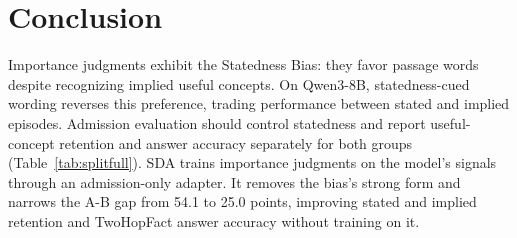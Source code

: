 \section{Conclusion}\label{sec:conclusion}

Importance judgments exhibit the Statedness Bias: they favor passage words despite recognizing implied useful concepts. On Qwen3-8B, statedness-cued wording reverses this preference, trading performance between stated and implied episodes. Admission evaluation should control statedness and report useful-concept retention and answer accuracy separately for both groups (Table~\ref{tab:splitfull}). SDA trains importance judgments on the model's signals through an admission-only adapter. It removes the bias's strong form and narrows the A-B gap from 54.1 to 25.0 points, improving stated and implied retention and TwoHopFact answer accuracy without training on it.
